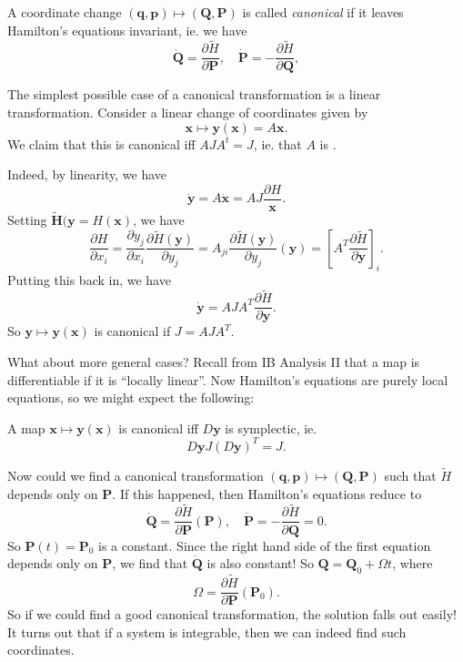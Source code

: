 \documentclass[a4paper]{article}
\begin{document}
\begin{defi}
  A coordinate change $(\mathbf{q}, \mathbf{p}) \mapsto (\mathbf{Q}, \mathbf{P})$ is called \emph{canonical} if it leaves Hamilton's equations invariant, ie. we have
  \[
    \dot{\mathbf{Q}} = \frac{\partial \tilde{H}}{\partial \mathbf{P}},\quad \dot{\mathbf{P}} = -\frac{\partial \tilde{H}}{\partial \mathbf{Q}},
  \]
\end{defi}

\begin{eg}
  The simplest possible case of a canonical transformation is a linear transformation. Consider a linear change of coordinates given by
  \[
    \mathbf{x} \mapsto \mathbf{y}(\mathbf{x}) = A\mathbf{x}.
  \]
  We claim that this is canonical iff $AJA^t = J$, ie. that $A$ is .

  Indeed, by linearity, we have
  \[
    \dot{\mathbf{y}} = A\dot{\mathbf{x}} = AJ\frac{\partial H}{\mathbf{x}}.
  \]
  Setting $\tilde{\mathbf{H}}(\mathbf{y} = H(\mathbf{x})$, we have
  \[
    \frac{\partial H}{\partial x_i} = \frac{\partial y_j}{\partial x_i} \frac{\partial \tilde{H}(\mathbf{y})}{\partial y_j} = A_{ji} \frac{\partial \tilde{H}(\mathbf{y})}{\partial y_j}(\mathbf{y}) = \left[A^T \frac{\partial \tilde{H}}{\partial \mathbf{y}}\right]_i.
  \]
  Putting this back in, we have
  \[
    \dot{\mathbf{y}} = AJA^T \frac{\partial\tilde{H}}{\partial \mathbf{y}}.
  \]
  So $\mathbf{y} \mapsto \mathbf{y}(\mathbf{x})$ is canonical if $J = AJA^T$.
\end{eg}

What about more general cases? Recall from IB Analysis II that a map is differentiable if it is ``locally linear''. Now Hamilton's equations are purely local equations, so we might expect the following:
\begin{prop}
  A map $\mathbf{x} \mapsto \mathbf{y}(\mathbf{x})$ is canonical iff $D\mathbf{y}$ is symplectic, ie.
  \[
    D\mathbf{y} J (D\mathbf{y})^T  = J.
  \]
\end{prop}

Now could we find a canonical transformation $(\mathbf{q}, \mathbf{p}) \mapsto (\mathbf{Q}, \mathbf{P})$ such that $\tilde{H}$ depends only on $\mathbf{P}$. If this happened, then Hamilton's equations reduce to
\[
  \dot{\mathbf{Q}} = \frac{\partial \tilde{H}}{\partial \mathbf{P}}(\mathbf{P}),\quad \dot{\mathbf{P}} = -\frac{\partial \tilde{H}}{\partial \mathbf{Q}} = 0.
\]
So $\mathbf{P}(t) = \mathbf{P}_0$ is a constant. Since the right hand side of the first equation depends only on $\mathbf{P}$, we find that $\dot{\mathbf{Q}}$ is also constant! So $\mathbf{Q} = \mathbf{Q}_0 + \Omega t$, where
\[
  \Omega = \frac{\partial \tilde{H}}{\partial \mathbf{P}} (\mathbf{P}_0).
\]
So if we could find a good canonical transformation, the solution falls out easily! It turns out that if a system is integrable, then we can indeed find such coordinates.
\end{document}
